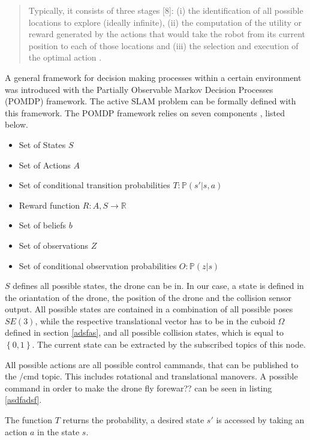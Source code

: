 	\begin{quote}
	Typically, it consists of three stages [8]: (i) the identification of all possible locations
to explore (ideally infinite), (ii) the computation of the utility or reward generated by the actions that
would take the robot from its current position to each of those locations and (iii) the selection and
execution of the optimal action \cite{deep}. 
\end{quote}

A general framework for decision making processes within a certain environment was introduced with the Partially Observable Markov Decision Processes (POMDP) framework. 
	The active SLAM problem can be formally defined with this framework. 
	The POMDP framework relies on seven components \cite{thesisvandenhof}, listed below. 
	
	\begin{itemize}
	\item{Set of States $S$}
	\item{Set of Actions $A$}
	\item{Set of conditional transition probabilities $T: \mathbb{P}(s'|s, a)$}
	\item{Reward function $R : A, S \rightarrow \mathbb{R}$}
	\item{Set of beliefs $b$}
	\item{Set of observations $Z$}
	\item{Set of conditional observation probabilities $O: \mathbb{P}(z|s)$}
	\end{itemize}
	
	$S$ defines all possible states, the drone can be in. In our case, a state is defined in the oriantation of the drone, the position of the drone and the collision sensor output.
	All possible states are contained in a combination of all possible poses $SE(3)$, while the respective translational vector has to be in the cuboid $\Omega$ defined in section \ref{adsfas},  
	and all possible collision states, which is equal to $\left\{0,1\right\}$. The current state can be extracted by the subscribed topics of this node. 
	
	All possible actions are all possible control cammands, that can be published to the /cmd topic. This includes rotational and translational manovers. A possible 
	command in order to make the drone fly forewar?? can be seen in listing \ref{asdfadsf}. 
	
	The function $T$ returns the probability, a desired state $s'$ is accessed by taking an action $a$ in the state $s$. 
	
